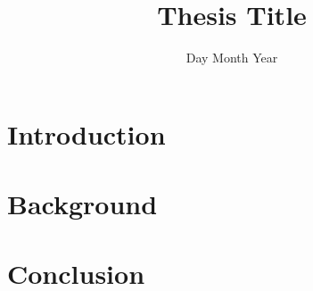 \documentclass[12pt,twoside]{report}
\title{Thesis Title}
\date{Day Month Year}
\begin{document}
\maketitle





\chapter{Introduction}


\chapter{Background}


\chapter{Conclusion}




\appendix

% 

\printbibliography[heading=bibintoc, title={References}]
\end{document}
